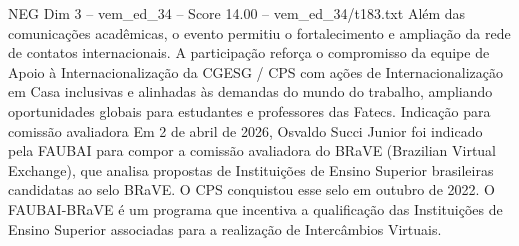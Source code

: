 \begin{textsample}{NEG Dim 3 – vem\_ed\_34 – Score 14.00 – vem\_ed\_34/t183.txt}
Além das comunicações acadêmicas, o evento permitiu o fortalecimento e ampliação da rede de contatos internacionais.
A participação reforça o compromisso da equipe de Apoio à Internacionalização da CGESG / CPS com ações de Internacionalização em Casa inclusivas e alinhadas às demandas do mundo do trabalho, ampliando oportunidades globais para estudantes e professores das Fatecs.
Indicação para comissão avaliadora Em 2 de abril de 2026, Osvaldo Succi Junior foi indicado pela FAUBAI para compor a comissão avaliadora do BRaVE (Brazilian Virtual Exchange), que analisa propostas de Instituições de Ensino Superior brasileiras candidatas ao selo BRaVE.
O CPS conquistou esse selo em outubro de 2022.
O FAUBAI-BRaVE é um programa que incentiva a qualificação das Instituições de Ensino Superior associadas para a realização de Intercâmbios Virtuais.

\end{textsample}
